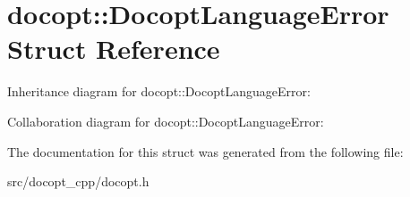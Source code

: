 \hypertarget{structdocopt_1_1DocoptLanguageError}{}\section{docopt\+:\+:Docopt\+Language\+Error Struct Reference}
\label{structdocopt_1_1DocoptLanguageError}


Inheritance diagram for docopt\+:\+:Docopt\+Language\+Error\+:


Collaboration diagram for docopt\+:\+:Docopt\+Language\+Error\+:


The documentation for this struct was generated from the following file\+:\begin{DoxyCompactItemize}
\item 
src/docopt\+\_\+cpp/docopt.\+h\end{DoxyCompactItemize}
